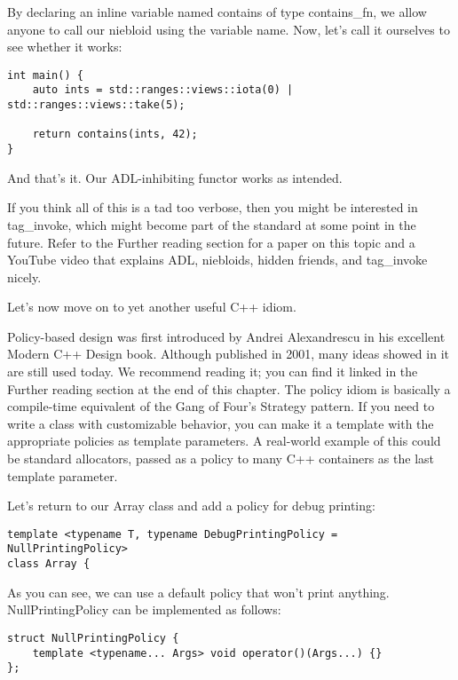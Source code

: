 By declaring an inline variable named contains of type contains\_fn, we allow anyone to call our niebloid using the variable name. Now, let's call it ourselves to see whether it works:

\begin{lstlisting}[style=styleCXX]
int main() {
	auto ints = std::ranges::views::iota(0) | std::ranges::views::take(5);
	
	return contains(ints, 42);
}
\end{lstlisting}

And that's it. Our ADL-inhibiting functor works as intended.

If you think all of this is a tad too verbose, then you might be interested in tag\_invoke, which might become part of the standard at some point in the future. Refer to the Further reading section for a paper on this topic and a YouTube video that explains ADL, niebloids, hidden friends, and tag\_invoke nicely.

Let's now move on to yet another useful C++ idiom.


Policy-based design was first introduced by Andrei Alexandrescu in his excellent Modern C++ Design book. Although published in 2001, many ideas showed in it are still used today. We recommend reading it; you can find it linked in the Further reading section at the end of this chapter. The policy idiom is basically a compile-time equivalent of the Gang of Four's Strategy pattern. If you need to write a class with customizable behavior, you can make it a template with the appropriate policies as template parameters. A real-world example of this could be standard allocators, passed as a policy to many C++ containers as the last template parameter.

Let's return to our Array class and add a policy for debug printing:

\begin{lstlisting}[style=styleCXX]
template <typename T, typename DebugPrintingPolicy = NullPrintingPolicy>
class Array {
\end{lstlisting}

As you can see, we can use a default policy that won't print anything. NullPrintingPolicy can be implemented as follows:

\begin{lstlisting}[style=styleCXX]
struct NullPrintingPolicy {
	template <typename... Args> void operator()(Args...) {}
};
\end{lstlisting}

